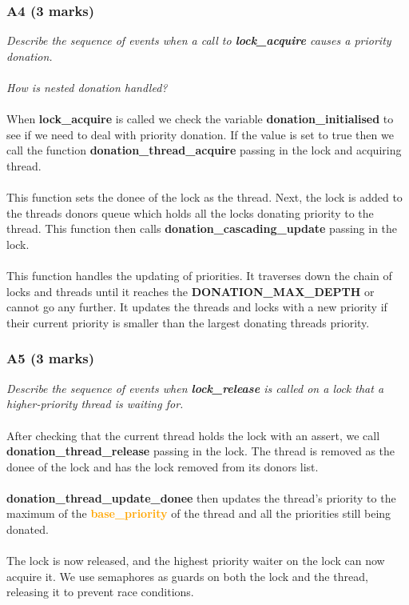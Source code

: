 \documentclass{report}
\newcommand{\question}[1]{\textit{#1} \\ }
\newcommand{\fun}[1]{\textcolor{Emerald}{\textbf{#1}}}
\newcommand{\struct}[1]{\textcolor{orange}{\textbf{#1}}}
\newcommand{\var}[1]{\textcolor{RoyalPurple}{\textbf{#1}}}
\newcommand{\const}[1]{\textcolor{BrickRed}{\textbf{#1}}}
\begin{document}
                \subsubsection*{A4  (3 marks)}
                    \question{Describe the sequence of events when a call to \fun{lock\_acquire} causes a priority donation. 
                    \\
                    \\How is nested donation handled?} 
                    \\
                    When \fun{lock\_acquire} is called we check the variable \var{donation\_initialised} to see if we need to deal with 
                    priority donation. If the value is set to true then we call the function \fun{donation\_thread\_acquire} 
                    passing in the lock and acquiring thread. 
                    \\ 
                    \\ This function sets the donee of the lock as the thread. 
                    Next, the lock is added to the threads donors queue which holds all the locks donating priority to 
                    the thread. This function then calls \fun{donation\_cascading\_update} passing in the lock. 
                    \\ 
                    \\ This function 
                    handles the updating of priorities. It traverses down the chain of locks and threads until it reaches the 
                    \const{DONATION\_MAX\_DEPTH} or cannot go any further. It updates the threads and locks with a new priority if 
                    their current priority is smaller than the largest donating threads priority.
                \subsubsection*{A5  (3 marks)}
                    \question{Describe the sequence of events when \fun{lock\_release} is called on a lock that a higher-priority thread is waiting for.} 
                    \\ After checking that the current thread holds the lock with an assert, we call \fun{donation\_thread\_release} 
                    passing in the lock. The thread is removed as the donee of the lock and has the lock removed from its donors list.
                    \\ \\
                    \fun{donation\_thread\_update\_donee} then updates the thread's priority to the maximum of the \struct{base\_priority} 
                    of the thread and all the priorities still being donated.
                    \\ \\ The lock is now released, and the highest priority waiter on the lock can now acquire it.
                    We use semaphores as guards on both the lock and the thread, releasing it to prevent race conditions.
\end{document}

